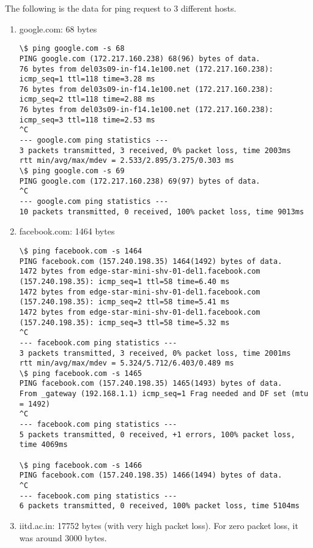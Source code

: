 \documentclass[a4paper]{article}
\begin{document}
The following is the data for ping request to 3 different hosts.
\begin{enumerate}
\item google.com: 68 bytes

\begin{lstlisting}
\$ ping google.com -s 68
PING google.com (172.217.160.238) 68(96) bytes of data.
76 bytes from del03s09-in-f14.1e100.net (172.217.160.238): icmp_seq=1 ttl=118 time=3.28 ms
76 bytes from del03s09-in-f14.1e100.net (172.217.160.238): icmp_seq=2 ttl=118 time=2.88 ms
76 bytes from del03s09-in-f14.1e100.net (172.217.160.238): icmp_seq=3 ttl=118 time=2.53 ms
^C
--- google.com ping statistics ---
3 packets transmitted, 3 received, 0% packet loss, time 2003ms
rtt min/avg/max/mdev = 2.533/2.895/3.275/0.303 ms
\$ ping google.com -s 69
PING google.com (172.217.160.238) 69(97) bytes of data.
^C
--- google.com ping statistics ---
10 packets transmitted, 0 received, 100% packet loss, time 9013ms

\end{lstlisting}

\item facebook.com: 1464 bytes

\begin{lstlisting}
\$ ping facebook.com -s 1464
PING facebook.com (157.240.198.35) 1464(1492) bytes of data.
1472 bytes from edge-star-mini-shv-01-del1.facebook.com (157.240.198.35): icmp_seq=1 ttl=58 time=6.40 ms
1472 bytes from edge-star-mini-shv-01-del1.facebook.com (157.240.198.35): icmp_seq=2 ttl=58 time=5.41 ms
1472 bytes from edge-star-mini-shv-01-del1.facebook.com (157.240.198.35): icmp_seq=3 ttl=58 time=5.32 ms
^C
--- facebook.com ping statistics ---
3 packets transmitted, 3 received, 0% packet loss, time 2001ms
rtt min/avg/max/mdev = 5.324/5.712/6.403/0.489 ms
\$ ping facebook.com -s 1465
PING facebook.com (157.240.198.35) 1465(1493) bytes of data.
From _gateway (192.168.1.1) icmp_seq=1 Frag needed and DF set (mtu = 1492)
^C
--- facebook.com ping statistics ---
5 packets transmitted, 0 received, +1 errors, 100% packet loss, time 4069ms

\$ ping facebook.com -s 1466
PING facebook.com (157.240.198.35) 1466(1494) bytes of data.
^C
--- facebook.com ping statistics ---
6 packets transmitted, 0 received, 100% packet loss, time 5104ms
\end{lstlisting}


\item iitd.ac.in: 17752 bytes (with very high packet loss). For zero packet loss, it was around 3000 bytes.


\end{enumerate}
\end{document}
